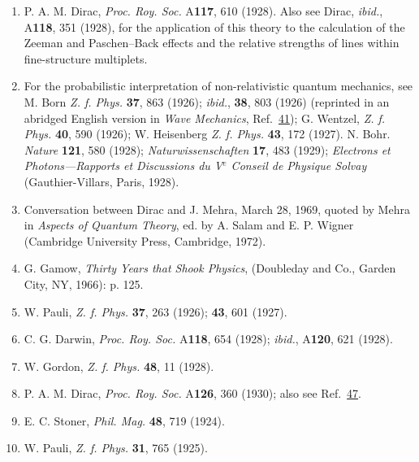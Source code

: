\begin{enumerate}
\item\label{ref:1.15} P. A. M. Dirac, \emph{Proc. Roy. Soc.} A\textbf{117}, 610 (1928). Also
see Dirac, \emph{ibid.}, A\textbf{118}, 351 (1928), for the application of this
theory to the calculation of the Zeeman and Paschen--Back effects and the
relative strengths of lines within fine-structure multiplets.

\item\label{ref:1.16} For the probabilistic interpretation of non-relativistic quantum
mechanics, see M. Born \emph{Z. f. Phys.} \textbf{37}, 863 (1926); \emph{ibid.},
\textbf{38}, 803 (1926) (reprinted in an abridged English version in \emph{Wave
Mechanics}, Ref.~\hyperref[ref:1.41]{41}); G. Wentzel, \emph{Z. f. Phys.} \textbf{40}, 590 (1926);
W. Heisenberg \emph{Z. f. Phys.} \textbf{43}, 172 (1927). N. Bohr.
\emph{Nature} \textbf{121}, 580 (1928); \emph{Naturwissenschaften} \textbf{17},
483 (1929); \emph{Electrons et Photons---Rapports et Discussions du V$^e$
Conseil de Physique Solvay} (Gauthier-Villars, Paris, 1928).

\item\label{ref:1.17} Conversation between Dirac and J. Mehra, March 28, 1969, quoted by
Mehra in \emph{Aspects of Quantum Theory}, ed. by A. Salam and E. P. Wigner
(Cambridge University Press, Cambridge, 1972).

\item\label{ref:1.18} G. Gamow, \emph{Thirty Years that Shook Physics}, (Doubleday and Co.,
Garden City, NY, 1966): p. 125.

\item\label{ref:1.19} W. Pauli, \emph{Z. f. Phys.} \textbf{37}, 263 (1926); \textbf{43}, 601
(1927).

\item\label{ref:1.20} C. G. Darwin, \emph{Proc. Roy. Soc.} A\textbf{118}, 654 (1928);
\emph{ibid.}, A\textbf{120}, 621 (1928).

\item\label{ref:1.21} W. Gordon, \emph{Z. f. Phys.} \textbf{48}, 11 (1928).

\item\label{ref:1.22} P. A. M. Dirac, \emph{Proc. Roy. Soc.} A\textbf{126}, 360 (1930); also
see Ref.~\hyperref[ref:1.47]{47}.

\item\label{ref:1.23} E. C. Stoner, \emph{Phil. Mag.} \textbf{48}, 719 (1924).

\item\label{ref:1.24} W. Pauli, \emph{Z. f. Phys.} \textbf{31}, 765 (1925).


\end{enumerate}
